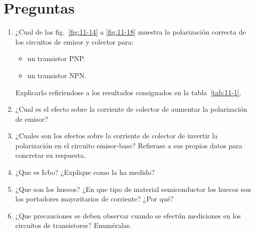 \documentclass[a4paper,12pt]{article}
\begin{document}
\section{\textbf{Preguntas}}
\begin{enumerate}
    \item ¿Cual de las fig.~\ref{fig:11-14} a \ref{fig:11-18} muestra la polarización correcta de los circuitos de emisor y
          colector para:
          \begin{itemize}
              \item un transistor PNP.
              \item un transistor NPN.
          \end{itemize}
          Explicarlo refiriendose a los resultados consignados en la tabla~\ref{tab:11-1}.
    \item ¿Cual es el efecto sobre la corriente de colector de aumentar la polarización de emisor?
    \item ¿Cuales son los efectos sobre la corriente de colector de invertir la polarización en
          el circuito emisor-base? Refierase a sus propios datos para concretar su respuesta.
    \item ¿Que es Icbo? ¿Explique como la ha medido?
    \item ¿Que son los huecos? ¿En que tipo de material semiconductor los huecos son los portadores
          mayoritarios de corriente? ¿Por qué?
    \item ¿Que precauciones se deben observar cuando se efectún mediciones en los circuitos de
          transistores? Enuméralas.
\end{enumerate}

\end{document}
